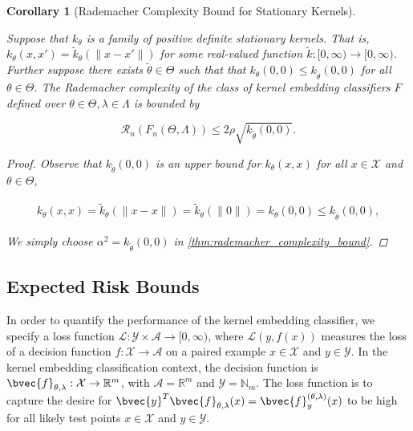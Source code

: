 \documentclass{article}
\newtheorem{corollary}[theorem]{Corollary}
\begin{document}
		\begin{corollary}[Rademacher Complexity Bound for Stationary Kernels]
		\label{thm:rademacher_complexity_stationary_kernels_bound}
	
			Suppose that $k_{\theta}$ is a family of positive definite stationary kernels. That is, $k_{\theta} (x, x') = \tilde{k}_{\theta}( \| x - x' \| )$ for some real-valued function $\tilde{k} : [0, \infty) \to [0, \infty)$. Further suppose there exists $\tilde{\theta} \in \Theta$ such that that $k_{\theta}(0, 0) \leq k_{\tilde{\theta}}(0, 0)$ for all $\theta \in \Theta$. The Rademacher complexity of the class of kernel embedding classifiers $F$ defined over $\theta \in \Theta, \lambda \in \Lambda$ is bounded by
		
			\begin{equation}
				\mathcal{R}_{n}(F_{n}(\Theta, \Lambda)) \leq 2 \rho \sqrt{k_{\tilde{\theta}}(0, 0)}.
			\end{equation}
			
			\begin{proof}
				
				Observe that $k_{\tilde{\theta}}(0, 0)$ is an upper bound for $k_{\theta}(x, x)$ for all $x \in \mathcal{X}$ and $\theta \in \Theta$,
				
				\begin{equation}
					\begin{aligned}
						k_{\theta}(x, x) = \tilde{k}_{\theta}( \| x - x \| ) = \tilde{k}_{\theta}( \| 0 \| ) = k_{\theta}(0, 0) \leq k_{\tilde{\theta}}(0, 0),
					\end{aligned}
				\end{equation}
				
				We simply choose $\alpha^{2} = k_{\tilde{\theta}}(0, 0)$ in \cref{thm:rademacher_complexity_bound}.
			\end{proof}
		
		\end{corollary}
	
	\subsection{Expected Risk Bounds}
	\label{thm:expected_risk_bound}
	
		In order to quantify the performance of the kernel embedding classifier, we specify a loss function $\mathcal{L} : \mathcal{Y} \times \mathcal{A} \to [0, \infty)$, where $\mathcal{L}(y, f(x))$ measures the loss of a decision function $f : \mathcal{X} \to \mathcal{A}$ on a paired example $x \in \mathcal{X}$ and $y \in \mathcal{Y}$. In the kernel embedding classification context, the decision function is $\bvec{f}_{\theta, \lambda} : \mathcal{X} \to \mathbb{R}^{m}$, with $\mathcal{A} = \mathbb{R}^{m}$ and $\mathcal{Y} = \mathbb{N}_{m}$. The loss function is to capture the desire for $\bvec{y}^{T} \bvec{f}_{\theta, \lambda}(x) = \bvec{f}_{y}^{(\theta, \lambda)}(x)$ to be high for all likely test points $x \in \mathcal{X}$ and $y \in \mathcal{Y}$.
		
\end{document}
